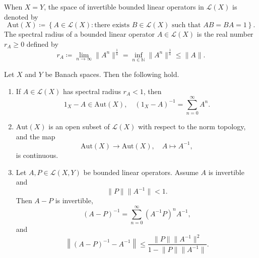 \begin{remark}
    When \(X = Y\), the space of invertible bounded linear operators in \(\mathcal{L} (X)\) is denoted by 
    \[
        \mathrm{Aut}(X) \coloneqq \left\{ A \in \mathcal{L} (X): \text{there exists } B \in \mathcal{L} (X) \text{ such that } AB = BA = 1   \right\}.  
    \]  
    The spectral radius of a bounded linear operator \(A \in \mathcal{L} (X)\) is the real number \(r_A \ge 0\) defined by 
    \[
        r_A \coloneqq \lim_{n \to \infty} \lVert A^n \rVert^{\frac{1}{n}} = \inf _{n \in \mathbb{N} } \lVert A^n \rVert^{\frac{1}{n}} \le \lVert A \rVert.   
    \] 
\end{remark}

\begin{corollary}
    Let \(X\) and \(Y\) be Banach spaces. Then the following hold. 
    \begin{enumerate}
        \item If \(A \in \mathcal{L} (X)\) has spectral radius \(r_A < 1\), then 
        \[
            1_X - A \in \mathrm{Aut}(X), \quad (1_X - A)^{-1} = \sum_{n=0}^{\infty} A^n.   
        \]
        \item \(\mathrm{Aut}(X) \) is an open subset of \(\mathcal{L} (X)\) with respect to the norm topology, and the map 
        \[
            \mathrm{Aut}(X) \to \mathrm{Aut}(X), \quad A \mapsto A^{-1},  
        \]  
        is continuous. 
        \item Let \(A, P \in \mathcal{L} (X, Y)\) be bounded linear operators. Assume \(A\) is invertible and 
        \[
            \lVert P \rVert \lVert A^{-1} \rVert < 1.  
        \]
        Then \(A - P\) is invertible, 
        \[
            (A - P)^{-1} = \sum_{n=0}^{\infty} (A^{-1} P)^n A^{-1}, 
        \] 
        and 
        \[
            \left\lVert (A - P)^{-1} - A^{-1} \right\rVert \le \frac{\lVert P \rVert \lVert A^{-1} \rVert^2  }{1 - \lVert P \rVert \lVert A^{-1} \rVert  }. 
        \]
    \end{enumerate}  
\end{corollary}

